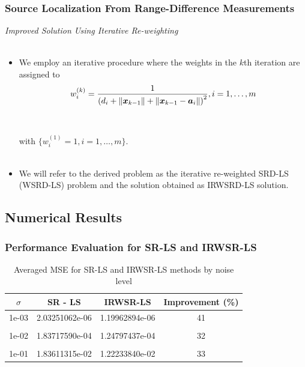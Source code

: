 \documentclass [t] {beamer} %
\begin{document}
\begin{frame} %
\frametitle{Source Localization From Range-Difference Measurements} %
{\large \textit{Improved Solution Using Iterative Re-weighting}} 
\\~\\
\normalsize
\begin{itemize}
\item 
We employ an iterative procedure  where the weights in the $k$th iteration are assigned to 
\begin{equation} 
\nonumber
w_i^{(k)}=\frac{1}{\left(d_i+\|\mbox{\boldmath$x$}_{k-1}\|+\|\mbox{\boldmath$x$}_{k-1}-\mbox{\boldmath$a$}_i\|\right)^2}, i=1,\ldots,m
\end{equation} \\~\\
with $\{w_i^{(1)} = 1, i=1,\ldots, m\}$.
 \\~\\
\item 
We will refer to the derived problem as the iterative re-weighted SRD-LS (WSRD-LS) problem and the solution obtained as IRWSRD-LS solution. 

\end{itemize}
\end{frame}


\subsection{Numerical Results}
\begin{frame} %

\frametitle{Performance Evaluation for SR-LS and IRWSR-LS} 
\normalsize
\begin{table}
\caption[c]{Averaged MSE for SR-LS and IRWSR-LS methods by noise level}
\begin{tabular}{|c|c|c|c|}
\toprule
\textbf{$\sigma$ } & \textbf{SR - LS} & \textbf{IRWSR-LS } & \textbf{Improvement (\%)}\\
\midrule 
1e-03&	2.03251062e-06&	1.19962894e-06& 41	\\ &&&\\
1e-02&	1.83717590e-04&	1.24797437e-04& 32	\\ &&&\\
1e-01&	1.83611315e-02&	1.22233840e-02& 33	\\ 
\bottomrule
\end{tabular}
\end{table}
%
\end{frame}
\end{document}
